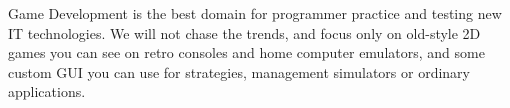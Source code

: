 \clearpage{}\label{gamedev}\secdown

Game Development is the best domain for programmer practice and testing new IT
technologies. We will not chase the trends, and focus only on old-style 2D
games you can see on retro
consoles and home computer emulators, and some custom GUI you can use for
strategies, management simulators or ordinary applications.

\secup
